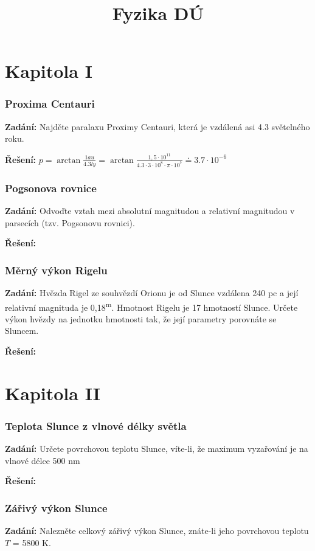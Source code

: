 \documentclass{article}
\title{\vspace{-2cm}Fyzika DÚ\vspace{-1.7cm}}
\date{}
\author{}
\begin{document}
\maketitle
\part*{Kapitola \textrm{I}}

\section*{Proxima Centauri}
\textbf{Zadání:} Najděte paralaxu Proximy Centauri, která je vzdálená asi 4.3 světelného roku.

\textbf{Řešení:} $p = \arctan \frac{1au}{4.3ly} = \arctan \frac{1,5 \cdot 10^{11}}{4.3\cdot 3 \cdot 10^{8} \cdot \pi \cdot 10^{7}} \doteq 3.7 \cdot 10^{-6}$

\section*{Pogsonova rovnice}
\textbf{Zadání:} Odvoďte vztah mezi absolutní magnitudou a relativní magnitudou v parsecích (tzv. Pogsonovu rovnici).

\textbf{Řešení:}


\section*{Měrný výkon Rigelu}
\textbf{Zadání:} Hvězda Rigel ze souhvězdí Orionu je od Slunce vzdálena 240 pc a její relativní
magnituda je 0,18\textsuperscript{m}. Hmotnost Rigelu je 17 hmotností Slunce. Určete výkon hvězdy na jednotku
hmotnosti tak, že její parametry porovnáte se Sluncem.

\textbf{Řešení:}

\part*{Kapitola \textrm{I\hspace{-.1em}I}}

\section*{Teplota Slunce z vlnové délky světla}
\textbf{Zadání:} Určete povrchovou teplotu Slunce, víte-li, že maximum vyzařování je na vlnové délce
500 nm

\textbf{Řešení:}

\section*{Zářivý výkon Slunce}
\textbf{Zadání:} Nalezněte celkový zářivý výkon Slunce, znáte-li jeho povrchovou teplotu $T$ = 5800 K.
\end{document}
